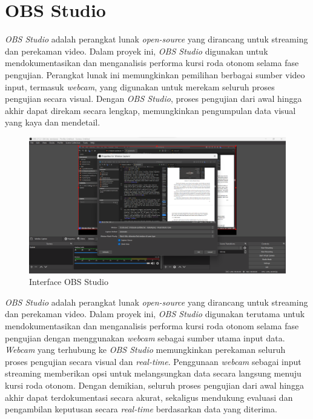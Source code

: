 \section{OBS Studio}
\label{sec:OBS Studio}

\emph{OBS Studio} adalah perangkat lunak \emph{open-source} yang dirancang untuk streaming dan perekaman video. Dalam proyek ini, \emph{OBS Studio} digunakan untuk mendokumentasikan dan menganalisis performa kursi roda otonom selama fase pengujian. Perangkat lunak ini memungkinkan pemilihan berbagai sumber video input, termasuk \emph{webcam}, yang digunakan untuk merekam seluruh proses pengujian secara visual. Dengan \emph{OBS Studio}, proses pengujian dari awal hingga akhir dapat direkam secara lengkap, memungkinkan pengumpulan data visual yang kaya dan mendetail.

\begin{figure}[H]
  \centering
  \includegraphics[scale=0.22]{gambar/OBSStudio.png}
  \caption{Interface OBS Studio}
  \label{fig:Gambar OBS}
\end{figure}

\emph{OBS Studio} adalah perangkat lunak \emph{open-source} yang dirancang untuk streaming dan perekaman video. Dalam proyek ini, \emph{OBS Studio} digunakan terutama untuk mendokumentasikan dan menganalisis performa kursi roda otonom selama fase pengujian dengan menggunakan \emph{webcam} sebagai sumber utama input data. \emph{Webcam} yang terhubung ke \emph{OBS Studio} memungkinkan perekaman seluruh proses pengujian secara visual dan \emph{real-time}. Penggunaan \emph{webcam} sebagai input streaming memberikan opsi untuk melangsungkan data secara langsung menuju kursi roda otonom. Dengan demikian, seluruh proses pengujian dari awal hingga akhir dapat terdokumentasi secara akurat, sekaligus mendukung evaluasi dan pengambilan keputusan secara \emph{real-time} berdasarkan data yang diterima.

